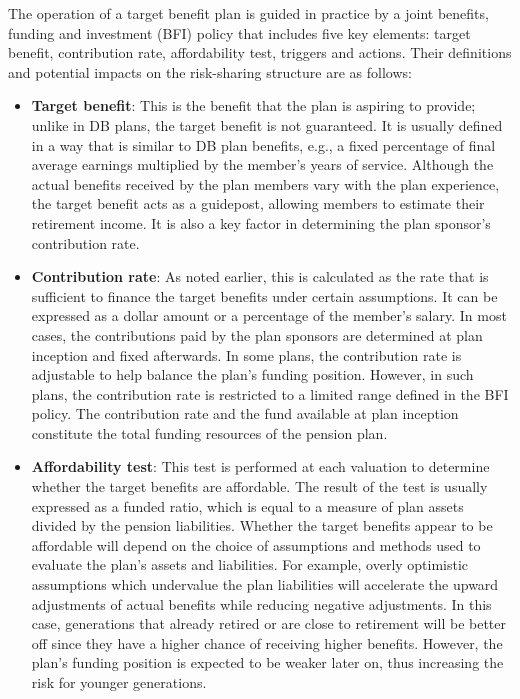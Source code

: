\documentclass{sfuthesis}
\numberwithin{equation}{chapter}
\begin{document}
		\justify
		The operation of a target benefit plan is guided in practice by a joint benefits, funding and investment (BFI) policy that includes five key elements: target benefit, contribution rate, affordability test, triggers and actions. Their definitions and potential impacts on the risk-sharing structure are as follows:
		\begin{itemize}
			\item \textbf{Target benefit}: This is the benefit that the plan is aspiring to provide; unlike in DB plans, the target benefit is not guaranteed. It is usually defined in a way that is similar to DB plan benefits, e.g., a fixed percentage of final average earnings multiplied by the member's years of service. Although the actual benefits received by the plan members vary with the plan experience, the target benefit acts as a guidepost, allowing members to estimate their retirement income. It is also a key factor in determining the plan sponsor's contribution rate.
			
			\item \textbf{Contribution rate}: As noted earlier, this is calculated as the rate that is sufficient to finance the target benefits under certain assumptions. It can be expressed as a dollar amount or a percentage of the member's salary. In most cases, the contributions paid by the plan sponsors are determined at plan inception and fixed afterwards. In some plans, the contribution rate is adjustable to help balance the plan's funding position. However, in such plans, the contribution rate is restricted to a limited range defined in the BFI policy. The contribution rate and the fund available at plan inception constitute the total funding resources of the pension plan.  
			
			\item \textbf{Affordability test}: This test is performed at each valuation to determine whether the target benefits are affordable. The result of the test is usually expressed as a funded ratio, which is equal to a measure of plan assets divided by the pension liabilities. Whether the target benefits appear to be affordable will depend on the choice of assumptions and methods used to evaluate the plan's assets and liabilities. For example, overly optimistic assumptions which undervalue the plan liabilities will accelerate the upward adjustments of actual benefits while reducing negative adjustments. In this case, generations that already retired or are close to retirement will be better off since they have a higher chance of receiving higher benefits. However, the plan's funding position is expected to be weaker later on, thus increasing the risk for younger generations. 
			

\end{itemize}
\end{document}
